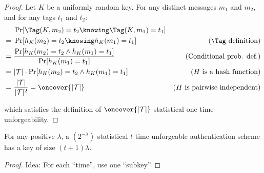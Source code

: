 \begin{proof}
    Let $K$ be a uniformly random key. For any distinct messages $m_1$ and $m_2$, and for any tags $t_1$ and $t_2$:
    \begin{align*}
         &\ \Pr[\Tag(K, m_2) = t_2 \knowing \Tag(K, m_1) = t_1]                     & \\
        =&\ \Pr[h_K(m_2) = t_2 \knowing h_K(m_1) = t_1]                             & \text{($\Tag$ definition)} \\
        =&\ \frac{\Pr[h_K(m_2) = t_2 \wedge h_K(m_1) = t_1]}{\Pr[h_K(m_1) = t_1]}   & \text{(Conditional prob. def.)} \\
        =&\ |\T| \cdot \Pr[h_K(m_2) = t_2 \wedge h_K(m_1) = t_1]                    & \text{($H$ is a hash function)} \\ 
        =&\ \frac{|\T|}{|\T|^2} = \oneover{|\T|}                                    & \text{($H$ is pairwise-independent)}
    \end{align*}

    which satisfies the definition of $\oneover{|\T|}$-statistical one-time unforgeability.
\end{proof}


\begin{theorem}
    For any positive $\lambda$, a $(2^{-\lambda})$-statistical $t$-time unforgeable authentication scheme has a key of size $(t + 1) \lambda$.
\end{theorem}

\begin{proof}
    Idea: For each ``time'', use one ``subkey''
\end{proof}
